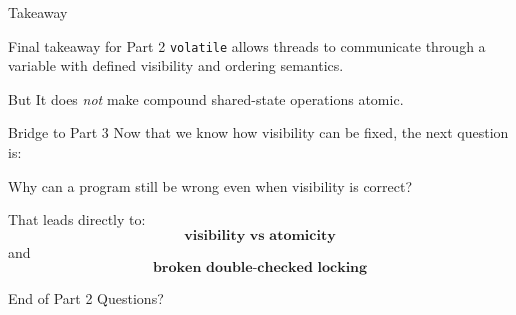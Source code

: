 \documentclass[aspectratio=169,11pt]{beamer}
\begin{document}
	\begin{frame}{Takeaway}
		\begin{alertblock}{Final takeaway for Part 2}
			\texttt{volatile} allows threads to communicate through a variable with defined visibility and ordering semantics.
		\end{alertblock}
		
		\vspace{0.35cm}
		
		\begin{block}{But}
			It does \emph{not} make compound shared-state operations atomic.
		\end{block}
		
		\vspace{0.35cm}
		
		\begin{exampleblock}{Bridge to Part 3}
			Now that we know how visibility can be fixed, the next question is:
			
			\begin{center}
				\Large
				Why can a program still be wrong even when visibility is correct?
			\end{center}
		\end{exampleblock}
		
		\vspace{0.2cm}
		
		That leads directly to:
		\[
		\textbf{visibility vs atomicity}
		\]
		and
		\[
		\textbf{broken double-checked locking}
		\]
	\end{frame}
	
	\begin{frame}{End of Part 2}
		\centering
		\Huge Questions?
	\end{frame}
	
\end{document}
